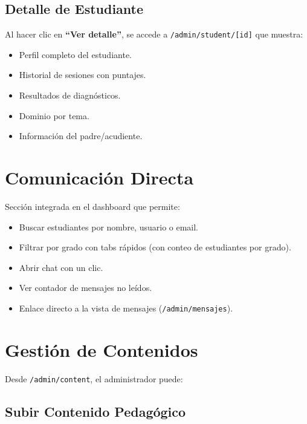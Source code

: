 \documentclass[12pt, a4paper, oneside]{book}
\begin{document}
\subsection{Detalle de Estudiante}

Al hacer clic en \textbf{``Ver detalle''}, se accede a \texttt{/admin/student/[id]} que muestra:
\begin{itemize}
    \item Perfil completo del estudiante.
    \item Historial de sesiones con puntajes.
    \item Resultados de diagnósticos.
    \item Dominio por tema.
    \item Información del padre/acudiente.
\end{itemize}

\section{Comunicación Directa}

Sección integrada en el dashboard que permite:
\begin{itemize}
    \item Buscar estudiantes por nombre, usuario o email.
    \item Filtrar por grado con tabs rápidos (con conteo de estudiantes por grado).
    \item Abrir chat con un clic.
    \item Ver contador de mensajes no leídos.
    \item Enlace directo a la vista de mensajes (\texttt{/admin/mensajes}).
\end{itemize}

\section{Gestión de Contenidos}

Desde \texttt{/admin/content}, el administrador puede:

\subsection{Subir Contenido Pedagógico}
\end{document}
